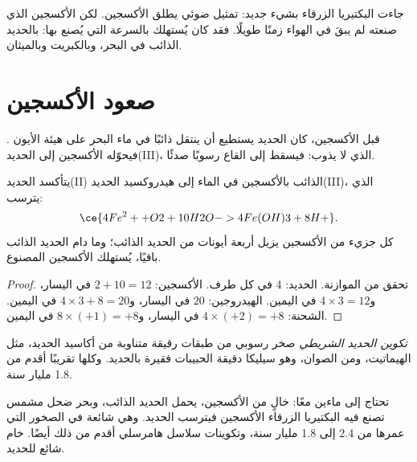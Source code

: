 جاءت البكتيريا الزرقاء بشيء جديد: تمثيل ضوئي يطلق
الأكسجين. لكن الأكسجين الذي صنعته لم يبقَ في الهواء زمنًا طويلًا. فقد
كان يُستهلك بالسرعة التي يُصنع بها: بالحديد الذائب في البحر،
وبالكبريت وبالميثان.

\section{صعود الأكسجين}

قبل الأكسجين، كان الحديد يستطيع أن ينتقل ذائبًا في ماء البحر على هيئة الأيون
. فيحوّله الأكسجين إلى الحديد(III)، الذي لا يذوب: فيسقط
إلى القاع رسوبًا صدئًا.

\begin{proposition}\label{prop:g12:early-earth:iron}
يتأكسد الحديد(II) الذائب بالأكسجين في الماء إلى هيدروكسيد الحديد(III)،
الذي يترسب:
\[
  \ce{4Fe^2+ + O2 + 10H2O -> 4Fe(OH)3 + 8H+} .
\]
كل جزيء من الأكسجين يزيل أربعة أيونات من الحديد الذائب؛ وما دام
الحديد الذائب باقيًا، يُستهلك الأكسجين المصنوع.
\end{proposition}

\begin{proof}
تحقق من الموازنة. الحديد: 4 في كل طرف. الأكسجين: $2 + 10 = 12$ في اليسار،
و$4 \times 3 = 12$ في اليمين. الهيدروجين: $20$ في اليسار، و$4 \times 3 + 8 =
20$ في اليمين. الشحنة: $4 \times (+2) = +8$ في اليسار، و$8 \times (+1) =
+8$ في اليمين.
\end{proof}

\begin{definition}\label{def:g12:early-earth:bif}
\emph{تكوين الحديد الشريطي} صخر
رسوبي من طبقات رقيقة متناوبة من أكاسيد الحديد، مثل
الهيماتيت، ومن الصوان، وهو سيليكا دقيقة الحبيبات فقيرة بالحديد. وكلها تقريبًا
أقدم من 1.8 مليار سنة.
\end{definition}

تحتاج  إلى ماءين معًا:  خالٍ من الأكسجين،
يحمل الحديد الذائب، وبحر ضحل مشمس تصنع فيه البكتيريا الزرقاء
الأكسجين فيترسب الحديد. وهي شائعة في الصخور التي عمرها من 2.4 إلى
1.8 مليار سنة، وتكوينات سلاسل هامرسلي أقدم من ذلك أيضًا.
 خام شائع للحديد.

